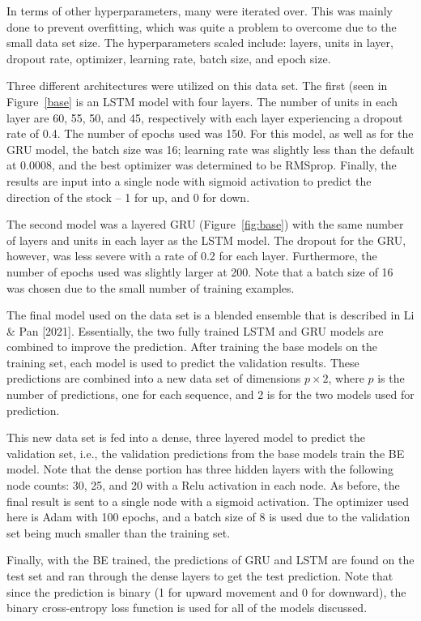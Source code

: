 \documentclass{article}
\begin{document}
In terms of other hyperparameters, many were iterated over. This was mainly done
to prevent overfitting, which was quite a problem to overcome due to the small
data set size. The hyperparameters scaled include: layers, units in layer, dropout
rate, optimizer, learning rate, batch size, and epoch size.

Three different architectures were utilized on this data set. The first (seen in
Figure~\ref{base} is an
LSTM model with four layers. The number of units in each layer are 60, 55, 50,
and 45, respectively with each layer experiencing a dropout rate of 0.4. The
number of epochs used was 150. For this
model, as well as for the GRU model, the batch size was 16; learning rate was
slightly less than the default at 0.0008, and the best optimizer was determined
to be RMSprop. Finally, the results are input into a single node with sigmoid
activation to predict the direction of the stock -- 1 for up, and 0 for down.

The second model was a layered GRU (Figure~\ref{fig:base}) with the same number
of layers and units in
each layer as the LSTM model. The dropout for the GRU, however, was less severe
with a rate of 0.2 for each layer. Furthermore, the number of epochs used was
slightly larger at 200. Note that a batch size of 16 was chosen due to the small
number of training examples.

The final model used on the data set is a blended ensemble that is
described in Li \& Pan [2021]. Essentially, the two fully trained LSTM and GRU models are
combined to improve the prediction. After training the base models on the training set,
each model is used to predict the validation results.
These predictions are combined into a new data set of dimensions $p
\times 2$, where $p$ is the number of predictions, one for each sequence, and 2
is for the two models used for prediction.

This new data set is fed into a dense, three layered model to predict the
validation set, i.e., the validation predictions from the base models train the
BE model.  Note that the dense portion has
three hidden layers with the following node counts: 30, 25, and 20 with a Relu
activation in each node. As before, the final result is sent to a single node
with a sigmoid activation. The optimizer used here is Adam with 100 epochs, and
a batch size of 8 is used due to the validation set being much smaller than
the training set.

Finally, with the BE trained, the predictions of GRU and LSTM are found on the
test set and ran through the dense layers to get the test prediction. Note that
since the prediction is binary (1 for upward movement and 0 for downward), the
binary cross-entropy loss function is used for all of the models discussed.
\end{document}
